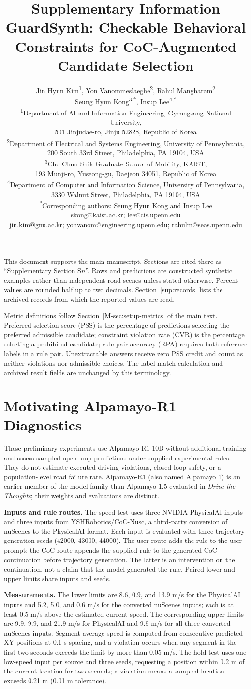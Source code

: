 \documentclass[10pt]{article}
\title{Supplementary Information\\[2pt]\large GuardSynth: Checkable Behavioral Constraints for CoC-Augmented Candidate Selection}
\author{\normalsize Jin Hyun Kim\textsuperscript{1}, Yon Vanommeslaeghe\textsuperscript{2}, Rahul Mangharam\textsuperscript{2}\\
\normalsize Seung Hyun Kong\textsuperscript{3,*}, Insup Lee\textsuperscript{4,*}\\[4pt]
\small \textsuperscript{1}Department of AI and Information Engineering, Gyeongsang National University,\\
\small 501 Jinjudae-ro, Jinju 52828, Republic of Korea\\
\small \textsuperscript{2}Department of Electrical and Systems Engineering, University of Pennsylvania,\\
\small 200 South 33rd Street, Philadelphia, PA 19104, USA\\
\small \textsuperscript{3}Cho Chun Shik Graduate School of Mobility, KAIST,\\
\small 193 Munji-ro, Yuseong-gu, Daejeon 34051, Republic of Korea\\
\small \textsuperscript{4}Department of Computer and Information Science, University of Pennsylvania,\\
\small 3330 Walnut Street, Philadelphia, PA 19104, USA\\[4pt]
\small \textsuperscript{*}Corresponding authors: Seung Hyun Kong and Insup Lee\\
\small \href{mailto:skong@kaist.ac.kr}{skong@kaist.ac.kr}; \href{mailto:lee@cis.upenn.edu}{lee@cis.upenn.edu}\\
\small \href{mailto:jin.kim@gnu.ac.kr}{jin.kim@gnu.ac.kr}; \href{mailto:yonvanom@engineering.upenn.edu}{yonvanom@engineering.upenn.edu}; \href{mailto:rahulm@seas.upenn.edu}{rahulm@seas.upenn.edu}}
\date{}
\begin{document}
\maketitle

This document supports the main manuscript. Sections are cited there as
``Supplementary Section S$n$''. Rows and predictions are constructed synthetic
examples rather than independent road scenes unless stated otherwise. Percent
values are rounded half up to two decimals. Section~\ref{sup:records} lists the
archived records from which the reported values are read.

Metric definitions follow Section~\ref{M-sec:setup-metrics} of the main text.
Preferred-selection score (PSS) is the percentage of predictions selecting the
preferred admissible candidate; constraint violation rate (CVR) is the
percentage selecting a prohibited candidate; rule-pair accuracy (RPA) requires
both reference labels in a rule pair. Unextractable answers receive zero PSS
credit and count as neither violations nor admissible choices. The label-match
calculation and archived result fields are unchanged by this terminology.

\section{Motivating Alpamayo-R1 Diagnostics}\label{sup:alpamayo}

These preliminary experiments use Alpamayo-R1-10B without additional training
and assess sampled open-loop predictions under supplied experimental rules.
They do not estimate executed driving violations, closed-loop safety, or a
population-level road failure rate. Alpamayo-R1 (also named Alpamayo 1) is an
earlier member of the model family than Alpamayo 1.5 evaluated in
\emph{Drive the Thoughts}; their weights and evaluations are distinct.

\textbf{Inputs and rule routes.} The speed test uses three NVIDIA PhysicalAI
inputs and three inputs from YSHRobotics/CoC-Nusc, a third-party conversion of
nuScenes to the PhysicalAI format. Each input is evaluated with three
trajectory-generation seeds (42000, 43000, 44000). The user route adds the rule
to the user prompt; the CoC route appends the supplied rule to the generated
CoC continuation before trajectory generation. The latter is an intervention on
the continuation, not a claim that the model generated the rule. Paired lower
and upper limits share inputs and seeds.

\textbf{Measurements.} The lower limits are 8.6, 0.9, and 13.9 m/s for the
PhysicalAI inputs and 5.2, 5.0, and 0.6 m/s for the converted nuScenes inputs;
each is at least 0.5 m/s above the estimated current speed. The corresponding
upper limits are 9.9, 9.9, and 21.9 m/s for PhysicalAI and 9.9 m/s for all
three converted nuScenes inputs. Segment-average
speed is computed from consecutive predicted XY positions at 0.1 s spacing, and
a violation occurs when any segment in the first two seconds exceeds the limit
by more than 0.05 m/s. The hold test uses one low-speed input per source and
three seeds, requesting a position within 0.2 m of the current location for two
seconds; a violation means a sampled location exceeds 0.21 m (0.01 m tolerance).
\end{document}
